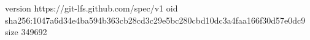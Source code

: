 version https://git-lfs.github.com/spec/v1
oid sha256:1047a6d34e4ba594b363cb28cd3c29e5bc280cbd10dc3a4faa166f30d57e0dc9
size 349692
